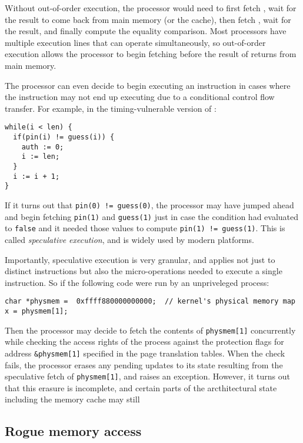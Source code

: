 \documentclass[11pt,twoside]{scrartcl}
\begin{document}
Without out-of-order execution, the processor would need to first fetch , wait for the result to come back from main memory (or the cache), then fetch , wait for the result, and finally compute the equality comparison. Most processors have multiple execution lines that can operate simultaneously, so out-of-order execution allows the processor to begin fetching  before the result of  returns from main memory.

The processor can even decide to begin executing an instruction in cases where the instruction may not end up executing due to a conditional control flow transfer. For example, in the timing-vulnerable version of :

\lstset{language=C}
\begin{lstlisting}
while(i < len) {
  if(pin(i) != guess(i)) {
    auth := 0;
    i := len;
  }
  i := i + 1;
}
\end{lstlisting}

If it turns out that \verb'pin(0) != guess(0)', the processor may have jumped ahead and begin fetching \verb'pin(1)' and \verb'guess(1)' just in case the condition had evaluated to \verb'false' and it needed those values to compute \verb'pin(1) != guess(1)'. This is called \emph{speculative execution}, and is widely used by modern platforms.

Importantly, speculative execution is very granular, and applies not just to distinct instructions but also the micro-operations needed to execute a single instruction. So if the following code were run by an unpriveleged process:

\lstset{language=C}
\begin{lstlisting}
char *physmem =  0xffff880000000000;  // kernel's physical memory map
x = physmem[1];
\end{lstlisting}

Then the processor may decide to fetch the contents of \verb'physmem[1]' concurrently while checking the access rights of the process against the protection flags for address \verb'&physmem[1]' specified in the page translation tables. When the check fails, the processor erases any pending updates to its state resulting from the speculative fetch of \verb'physmem[1]', and raises an exception. However, it turns out that this erasure is incomplete, and certain parts of the arcthitectural state including the memory cache may still 

\subsection{Rogue memory access}
\end{document}

